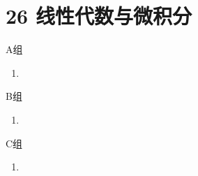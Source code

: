 \section*{26 线性代数与微积分}

\vspace{2ex}

\centerline{\heiti A组}
\begin{enumerate}
    \item
\end{enumerate}

\centerline{\heiti B组}
\begin{enumerate}
    \item
\end{enumerate}

\centerline{\heiti C组}
\begin{enumerate}
    \item
\end{enumerate}

\clearpage
